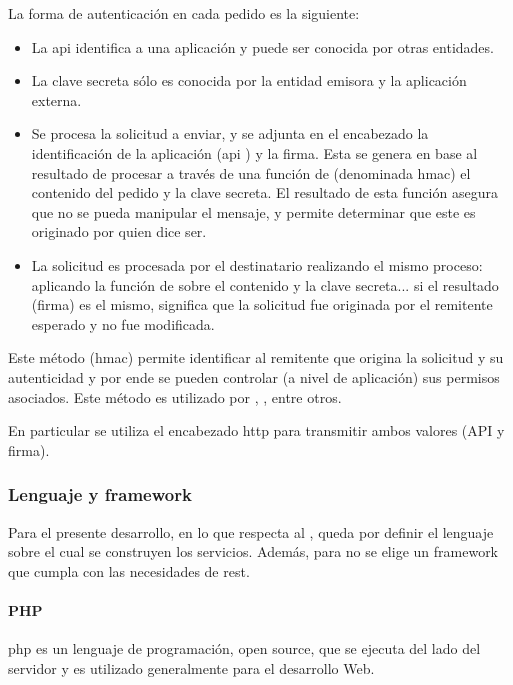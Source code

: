 La forma de autenticación en cada pedido es la siguiente:
\begin{itemize}
\item La \gls{api}  identifica a una aplicación y puede ser conocida por otras entidades.
\item La clave secreta sólo es conocida por la entidad emisora y la aplicación externa.
\item Se procesa la solicitud a enviar, y se adjunta en el encabezado la identificación de la aplicación (\gls{api} ) y la firma. Esta se genera en base al resultado de procesar a través de una función de  (denominada \gls{hmac}) el contenido del pedido y la clave secreta. El resultado de esta función asegura que no se pueda manipular el mensaje, y permite determinar que este es originado por quien dice ser.
\item La solicitud es procesada por el destinatario realizando el mismo proceso: aplicando la función de  sobre el contenido y la clave secreta... si el resultado (firma) es el mismo, significa que la solicitud fue originada por el remitente esperado y no fue modificada.
\end{itemize}

Este método (\gls{hmac}) permite identificar al remitente que origina la solicitud y su autenticidad\cite{krawczyk1997rfc} y por ende se pueden controlar (a nivel de aplicación) sus permisos asociados. Este método es utilizado por \cite{amazonApi}, ,  entre otros.

En particular se utiliza el encabezado \gls{http}  para transmitir ambos valores (API  y firma).

\subsubsection{Lenguaje y \gls{framework}}
\label{backend_lenguaje_framework}

Para el presente desarrollo, en lo que respecta al , queda por definir el lenguaje sobre el cual se construyen los servicios. Además, para no  se elige un \gls{framework} que cumpla con las necesidades de \gls{rest}.

\paragraph{PHP}

\gls{php} es un lenguaje de programación, \gls{open source}, que se ejecuta del lado del servidor y es utilizado generalmente para el desarrollo Web. 

